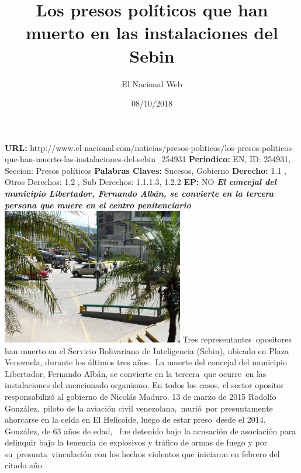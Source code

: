 \documentclass{article}%
\title{\textbf{Los presos políticos que han muerto en las instalaciones del Sebin}}%
\author{El Nacional Web}%
\date{08/10/2018}%
\begin{document}
%
\normalsize%
\maketitle%
\textbf{URL: }%
http://www.el{-}nacional.com/noticias/presos{-}politicos/los{-}presos{-}politicos{-}que{-}han{-}muerto{-}las{-}instalaciones{-}del{-}sebin\_254931\newline%
%
\textbf{Periodico: }%
EN, %
ID: %
254931, %
Seccion: %
Presos políticos\newline%
%
\textbf{Palabras Claves: }%
Sucesos, Gobierno\newline%
%
\textbf{Derecho: }%
1.1%
, Otros Derechos: %
1.2%
, Sub Derechos: %
1.1.1.3, 1.2.2%
\newline%
%
\textbf{EP: }%
NO\newline%
\newline%
%
\textbf{\textit{El concejal del municipio Libertador, Fernando Albán, se convierte en la tercera persona que muere en el centro penitenciario}}%
\newline%
\newline%
%
\includegraphics[width=300px]{75.jpg}%
\newline%
%
Tres representantes~opositores han muerto en el Servicio Bolivariano de Inteligencia (Sebin), ubicado en Plaza Venezuela, durante los últimos tres años.~La muerte del concejal del municipio Libertador, Fernando Albán, se convierte en la tercera~que ocurre~en las instalaciones del mencionado organismo. En todos los casos, el sector opositor responsabilizó al gobierno de Nicolás Maduro.%
\newline%
%
13 de marzo de 2015%
\newline%
%
Rodolfo González,~piloto de la aviación civil venezolana,~murió~por presuntamente ahorcarse en la celda en El Helicoide, luego de estar preso~desde el 2014. González, de 63 años de edad,~ fue detenido bajo la acusación de asociación para delinquir bajo la tenencia de explosivos y tráfico de armas de fuego y por su~presunta~vinculación con los hechos violentos que iniciaron en febrero del citado año.%
\end{document}
